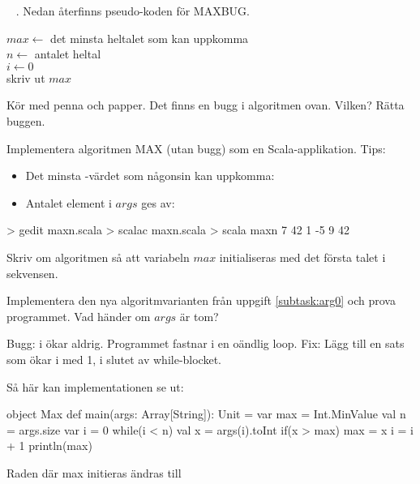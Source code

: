 \QUESTBEGIN

\Task  \what~ . Nedan återfinns pseudo-koden för MAXBUG.

\begin{algorithm}[H]

 $max \leftarrow$ det minsta heltalet som kan uppkomma  \\
 $n \leftarrow $ antalet heltal \\
 $i \leftarrow 0$ \\
 skriv ut $max$
\end{algorithm}

\Subtask\Pen Kör med penna och papper. Det finns en bugg i algoritmen ovan. Vilken? Rätta buggen.

\Subtask Implementera algoritmen MAX (utan bugg) som en Scala-applikation. Tips:
\begin{itemize}[noitemsep, nolistsep]
\item Det minsta -värdet som någonsin kan uppkomma: 
\item Antalet element i $args$ ges av: 
\end{itemize}

\begin{REPL}
> gedit maxn.scala
> scalac maxn.scala
> scala maxn 7 42 1 -5 9
42
\end{REPL}

\Subtask\Pen \label{subtask:arg0} Skriv om algoritmen så att variabeln $max$ initialiseras med det första talet i sekvensen.

\Subtask Implementera den nya algoritmvarianten från uppgift \ref{subtask:arg0} och prova programmet. Vad händer om $args$ är tom?

\SOLUTION


\TaskSolved \what
 

\SubtaskSolved  Bugg: i ökar aldrig. Programmet fastnar i en oändlig loop. Fix: Lägg till en sats som ökar i med 1, i slutet av while-blocket.

\SubtaskSolved  Så här kan implementationen se ut:
\begin{Code}
object Max {
  def main(args: Array[String]): Unit = {
    var max = Int.MinValue
    val n = args.size
    var i = 0
    while(i < n) {
      val x = args(i).toInt
      if(x > max) {
        max = x
      }
      i = i + 1
    }
    println(max)
  }
}
\end{Code}
\SubtaskSolved  Raden där max initieras ändras till  

